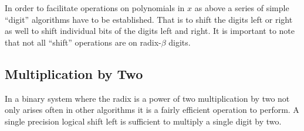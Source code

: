\documentclass[b5paper]{book}
\begin{document}
In order to facilitate operations on polynomials in $x$ as above a series of simple ``digit'' algorithms have to be established.  That is to shift
the digits left or right as well to shift individual bits of the digits left and right.  It is important to note that not all ``shift'' operations
are on radix-$\beta$ digits.  

\subsection{Multiplication by Two}

In a binary system where the radix is a power of two multiplication by two not only arises often in other algorithms it is a fairly efficient 
operation to perform.  A single precision logical shift left is sufficient to multiply a single digit by two.  
\end{document}
